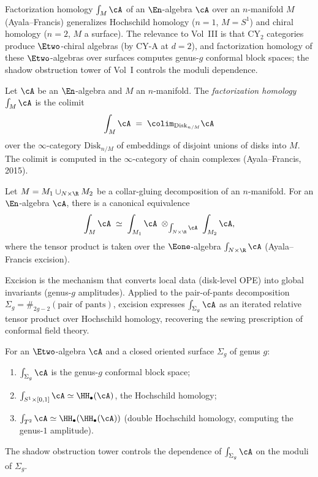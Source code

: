 Factorization homology $\int_M \cA$ of an $\En$-algebra $\cA$ over an
$n$-manifold $M$ (Ayala--Francis) generalizes Hochschild homology
($n = 1$, $M = S^1$) and chiral homology ($n = 2$, $M$ a surface).
The relevance to Vol~III is that CY$_2$ categories produce $\Etwo$-chiral
algebras (by CY-A at $d = 2$), and factorization homology of these
$\Etwo$-algebras over surfaces computes genus-$g$ conformal block spaces;
the shadow obstruction tower of Vol~I controls the moduli dependence.

\begin{definition}
\label{def:factorization-homology}
Let $\cA$ be an $\En$-algebra and $M$ an $n$-manifold. The
\emph{factorization homology} $\int_M \cA$ is the colimit
\[
 \int_M \cA \;=\; \colim_{\mathrm{Disk}_{n/M}} \cA
\]
over the $\infty$-category $\mathrm{Disk}_{n/M}$ of embeddings of
disjoint unions of disks into $M$. The colimit is computed in the
$\infty$-category of chain complexes (Ayala--Francis, 2015).
\end{definition}

\begin{proposition}
\label{prop:fh-excision}
Let $M = M_1 \cup_{N \times \R} M_2$ be a collar-gluing decomposition
of an $n$-manifold. For an $\En$-algebra $\cA$, there is a canonical
equivalence
\[
 \int_M \cA
 \;\simeq\;
 \int_{M_1} \cA \;\otimes_{\int_{N \times \R} \cA}\; \int_{M_2} \cA,
\]
where the tensor product is taken over the $\Eone$-algebra
$\int_{N \times \R} \cA$ (Ayala--Francis excision).
\end{proposition}

Excision is the mechanism that converts local data (disk-level OPE) into
global invariants (genus-$g$ amplitudes). Applied to the pair-of-pants
decomposition $\Sigma_g = \#_{2g-2}(\text{pair of pants})$, excision
expresses $\int_{\Sigma_g} \cA$ as an iterated relative tensor product
over Hochschild homology, recovering the sewing prescription of conformal
field theory.

\begin{proposition}
\label{prop:fh-e2-surface}
For an $\Etwo$-algebra $\cA$ and a closed oriented surface
$\Sigma_g$ of genus $g$:
\begin{enumerate}[label=(\roman*)]
 \item $\int_{\Sigma_g} \cA$ is the genus-$g$ conformal block space;
 \item $\int_{S^1 \times [0,1]} \cA \simeq \HH_\bullet(\cA)$, the
 Hochschild homology;
 \item $\int_{T^2} \cA \simeq \HH_\bullet(\HH_\bullet(\cA))$
 (double Hochschild homology, computing the genus-$1$ amplitude).
\end{enumerate}
The shadow obstruction tower controls the dependence of
$\int_{\Sigma_g} \cA$ on the moduli of $\Sigma_g$.
\end{proposition}

